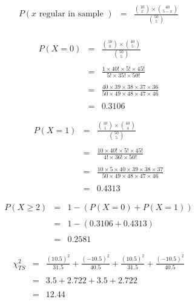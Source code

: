 


\begin{eqnarray*}
P(x \mbox{ regular in sample }) &=& \frac{ {10 \choose x} \times {40 \choose 5-x} }{ {50 \choose 5} } \\
\end{eqnarray*}




\begin{eqnarray*}
P(X=0) &=& \frac{ {10 \choose 0} \times {40 \choose 5} }{ {50 \choose 5} } \\
& & \\
&=& \frac{1 \times 40! \times 5! \times 45!}{5! \times 35! \times 50!} \\
& & \\
&=& \frac{40 \times 39 \times 38 \times 37 \times 36}{50 \times 49 \times 48 \times 47 \times 46} \\
& & \\
&=& 0.3106
\end{eqnarray*}


\begin{eqnarray*}
P(X=1) &=& \frac{ {10 \choose 1} \times {40 \choose 4} }{ {50 \choose 5} } \\
& & \\
&=& \frac{10 \times 40! \times 5! \times 45!}{4! \times 36! \times 50!} \\
& & \\
&=& \frac{10 \times 5 \times 40 \times 39 \times 38 \times 37 }{50 \times 49 \times 48 \times 47 \times 46} \\
& & \\
&=& 0.4313
\end{eqnarray*}

\begin{eqnarray*}
P(X \geq 2) &=& 1 - \left( P(X=0) + P(X=1) \right) \\
& & \\
&=&  1 - \left( 0.3106 + 0.4313 \right) \\
& & \\
&=& 0.2581
\end{eqnarray*}




\begin{eqnarray*}
\chi^2_{TS} &=& \frac{(10.5)^2}{31.5} + \frac{(-10.5)^2}{40.5} + \frac{(10.5)^2}{31.5} + \frac{(-10.5)^2}{40.5}\\
& & \\
&=& 3.5 + 2.722 + 3.5 + 2.722 \\
& & \\
&=& 12.44 \\
\end{eqnarray*}


